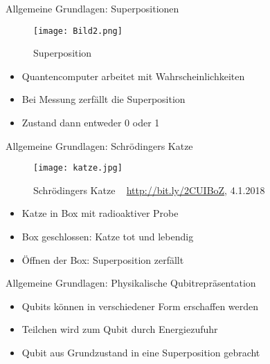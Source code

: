 \documentclass[]{beamer}
\begin{document}
\begin{frame}{Allgemeine Grundlagen: Superpositionen}
\begin{center}
\begin{figure}
  		\texttt{[image: Bild2.png]}
 	 	\caption{Superposition}
 	 	\centering
  	\end{figure}
	\begin{itemize}
	\item Quantencomputer arbeitet mit Wahrscheinlichkeiten
    \item Bei Messung zerfällt die Superposition
    \item Zustand dann entweder 0 oder 1
	\end{itemize}
\end{center}
\end{frame}

\begin{frame}{Allgemeine Grundlagen: Schrödingers Katze}
\begin{center}
\begin{figure}
  		\texttt{[image: katze.jpg]}
 	 	\caption{Schrödingers Katze ~ \footnotesize{\url{http://bit.ly/2CUIBoZ}, 4.1.2018}}
 	 	\centering
  	\end{figure}
	\begin{itemize}
    \item Katze in Box mit radioaktiver Probe
	\item Box geschlossen: Katze tot und lebendig
    \item Öffnen der Box: Superposition zerfällt
	\end{itemize}
\end{center}
\end{frame}

\begin{frame}{Allgemeine Grundlagen: Physikalische Qubitrepräsentation}
\begin{center}
\begin{itemize}
 \item Qubits können in verschiedener Form erschaffen werden
 \item Teilchen wird zum Qubit durch Energiezufuhr
 \item Qubit aus Grundzustand in eine Superposition gebracht
\end{itemize}

\end{center}
\end{frame}
\end{document}
